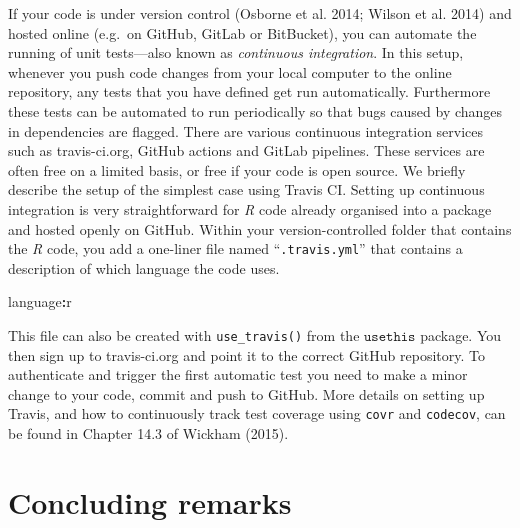 \documentclass[
]{article}
\newenvironment{Shaded}{\begin{snugshade}}{\end{snugshade}}
\newcommand{\NormalTok}[1]{#1}
\newcommand{\OperatorTok}[1]{\textcolor[rgb]{0.81,0.36,0.00}{\textbf{#1}}}
\begin{document}
If your code is under version control (Osborne et al. 2014; Wilson et al. 2014) and hosted online (e.g.~on GitHub, GitLab or BitBucket), you can automate the running of unit tests---also known as \emph{continuous integration}.
In this setup, whenever you push code changes from your local computer to the online repository, any tests that you have defined get run automatically.
Furthermore these tests can be automated to run periodically so that bugs caused by changes in dependencies are flagged.
There are various continuous integration services such as travis-ci.org, GitHub actions and GitLab pipelines.
These services are often free on a limited basis, or free if your code is open source.
\newline
\newline
We briefly describe the setup of the simplest case using Travis CI.
Setting up continuous integration is very straightforward for \emph{R} code already organised into a package and hosted openly on GitHub.
Within your version-controlled folder that contains the \emph{R} code, you add a one-liner file named ``\texttt{.travis.yml}'' that contains a description of which language the code uses.
\newline
{}\label{travis}

\begin{Shaded}
\begin{Highlighting}[]
\NormalTok{language}\OperatorTok{:}\NormalTok{r}
\end{Highlighting}
\end{Shaded}

This file can also be created with \texttt{use\_travis()} from the \(\texttt{usethis}\) package.
You then sign up to travis-ci.org and point it to the correct GitHub repository.
To authenticate and trigger the first automatic test you need to make a minor change to your code, commit and push to GitHub.
More details on setting up Travis, and how to continuously track test coverage using \texttt{covr} and \texttt{codecov}, can be found in Chapter 14.3 of Wickham (2015).

\hypertarget{concluding-remarks}{%
\section{Concluding remarks}\label{concluding-remarks}}
\end{document}
